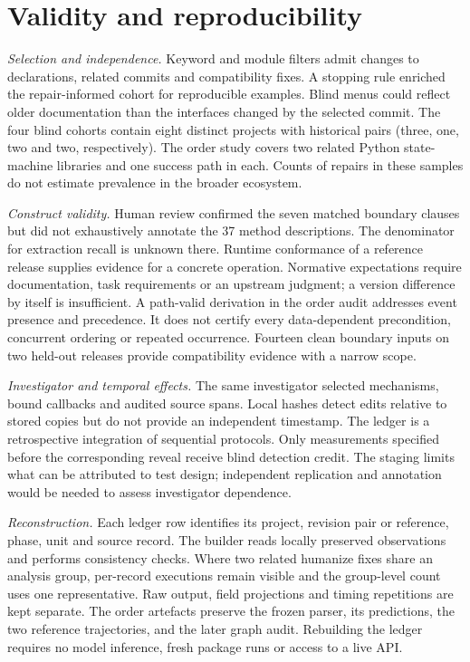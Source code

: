 \documentclass[conference]{IEEEtran}
\begin{document}
\section{Validity and reproducibility}
\emph{Selection and independence.} Keyword and module filters admit changes to declarations, related commits and compatibility fixes. A stopping rule enriched the repair-informed cohort for reproducible examples. Blind menus could reflect older documentation than the interfaces changed by the selected commit. The four blind cohorts contain eight distinct projects with historical pairs (three, one, two and two, respectively). The order study covers two related Python state-machine libraries and one success path in each. Counts of repairs in these samples do not estimate prevalence in the broader ecosystem.

\emph{Construct validity.} Human review confirmed the seven matched boundary clauses but did not exhaustively annotate the 37 method descriptions. The denominator for extraction recall is unknown there. Runtime conformance of a reference release supplies evidence for a concrete operation. Normative expectations require documentation, task requirements or an upstream judgment; a version difference by itself is insufficient. A path-valid derivation in the order audit addresses event presence and precedence. It does not certify every data-dependent precondition, concurrent ordering or repeated occurrence. Fourteen clean boundary inputs on two held-out releases provide compatibility evidence with a narrow scope.

\emph{Investigator and temporal effects.} The same investigator selected mechanisms, bound callbacks and audited source spans. Local hashes detect edits relative to stored copies but do not provide an independent timestamp. The ledger is a retrospective integration of sequential protocols. Only measurements specified before the corresponding reveal receive blind detection credit. The staging limits what can be attributed to test design; independent replication and annotation would be needed to assess investigator dependence.

\emph{Reconstruction.} Each ledger row identifies its project, revision pair or reference, phase, unit and source record. The builder reads locally preserved observations and performs consistency checks. Where two related humanize fixes share an analysis group, per-record executions remain visible and the group-level count uses one representative. Raw output, field projections and timing repetitions are kept separate. The order artefacts preserve the frozen parser, its predictions, the two reference trajectories, and the later graph audit. Rebuilding the ledger requires no model inference, fresh package runs or access to a live API.
\end{document}
